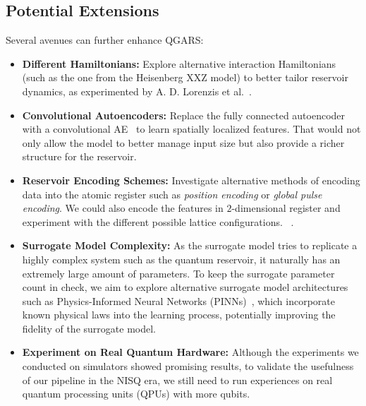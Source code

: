 \documentclass[conference]{IEEEtran}
\begin{document}
\subsection{Potential Extensions}
Several avenues can further enhance QGARS:
\begin{itemize}
    \item \textbf{Different Hamiltonians:}
    Explore alternative interaction Hamiltonians (such as the one from the Heisenberg XXZ model) to better tailor reservoir dynamics, as experimented by A. D. Lorenzis et al.~\cite{lorenzisHarnessingQuantumExtreme2025}.

    \item \textbf{Convolutional Autoencoders:}
    Replace the fully connected autoencoder with a convolutional AE~\cite{lerchConvolutionalAutoencodersSpatiallyinformed2022} to learn spatially localized features. That would not only allow the model to better manage input size but also provide a richer structure for the reservoir.
    
    \item \textbf{Reservoir Encoding Schemes:}
    Investigate alternative methods of encoding data into the atomic register such as \textit{position encoding} or \textit{global pulse encoding}. We could also encode the features in $2$-dimensional register and experiment with the different possible lattice configurations. ~\cite{kornjavcaLargescaleQuantumReservoir2024}.

    \item \textbf{Surrogate Model Complexity:}
    As the surrogate model tries to replicate a highly complex system such as the quantum reservoir, it naturally has an extremely large amount of parameters. To keep the surrogate parameter count in check, we aim to explore alternative surrogate model architectures such as Physics-Informed Neural Networks (PINNs)~\cite{raissiPhysicsInformedDeep2017}, which incorporate known physical laws into the learning process, potentially improving the fidelity of the surrogate model.

    \item \textbf{Experiment on Real Quantum Hardware:}
    Although the experiments we conducted on simulators showed promising results, to validate the usefulness of our pipeline in the NISQ era, we still need to run experiences on real quantum processing units (QPUs) with more qubits. 


\end{itemize}

\end{document}
